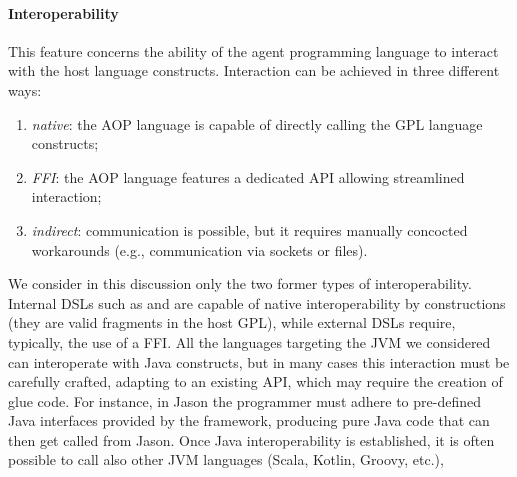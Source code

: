 \paragraph{Interoperability}
%
This feature concerns the ability of the agent programming language to interact with the host language constructs.
%
Interaction can be achieved in three different ways:
\begin{enumerate}
    \item \emph{native}: the \ac{AOP} language is capable of directly calling the \ac{GPL} language constructs;
    \item \emph{\ac{FFI}}: the \ac{AOP} language features a dedicated \ac{API} allowing streamlined interaction;
    \item \emph{indirect}: communication is possible, but it requires manually concocted workarounds
        (e.g., communication via sockets or files).
\end{enumerate}
%
We consider in this discussion only the two former types of interoperability.
%
Internal \acp{DSL} such as \phidias{} and \spadebdi{} are capable of native interoperability by constructions
(they are valid fragments in the host \ac{GPL}),
while external \acp{DSL} require, typically, the use of a \ac{FFI}.
%
All the languages targeting the \ac{JVM} we considered can interoperate with Java constructs,
but in many cases this interaction must be carefully crafted, adapting to an existing API,
which may require the creation of glue code.
%
For instance,
in Jason the programmer must adhere to pre-defined Java interfaces provided by the framework,
producing pure Java code that can then get called from Jason.
%
Once Java interoperability is established,
it is often possible to call also other \ac{JVM} languages
(Scala, Kotlin, Groovy, etc.),
